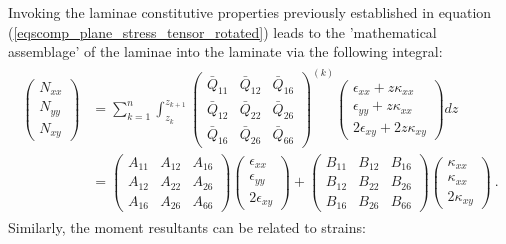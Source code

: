 Invoking the laminae constitutive properties previously established in equation (\ref{eqscomp_plane_stress_tensor_rotated}) leads to the 'mathematical assemblage' of the laminae into the laminate via the following integral:
\begin{gather} 
	\begin{aligned}
		\begin{pmatrix}
			N_{xx} \\
			N_{yy} \\
			N_{xy} 
		\end{pmatrix} 
		& = 
		\sum_{k=1}^n
		\int_{z_k}^{z_{k+1}}
		{\begin{pmatrix}
			\bar{Q}_{11} & \bar{Q}_{12} &  \bar{Q}_{16} \\
			\bar{Q}_{12} & \bar{Q}_{22} &  \bar{Q}_{26} \\
			\bar{Q}_{16} & \bar{Q}_{26} & \bar{Q}_{66} 
		\end{pmatrix}}^{(k)}
		\begin{pmatrix}
			\epsilon_{xx} + z \kappa_{xx}\\
			\epsilon_{yy} + z \kappa_{xx}\\
			2\epsilon_{xy} + 2z\kappa_{xy}
		\end{pmatrix}
		dz \\
		& =
		\begin{pmatrix}
			{A}_{11} & {A}_{12} &  {A}_{16} \\
			{A}_{12} & {A}_{22} &  {A}_{26} \\
			{A}_{16} & {A}_{26} & {A}_{66} 
		\end{pmatrix}
		\begin{pmatrix}
		\epsilon_{xx}\\
		\epsilon_{yy}\\
		2\epsilon_{xy}
		\end{pmatrix}
		+
		\begin{pmatrix}
		{B}_{11} & {B}_{12} &  {B}_{16} \\
		{B}_{12} & {B}_{22} &  {B}_{26} \\
		{B}_{16} & {B}_{26} & {B}_{66} 
		\end{pmatrix}
		\begin{pmatrix}
		 \kappa_{xx}\\
		\kappa_{xx}\\
		2\kappa_{xy}
		\end{pmatrix}\ .
		\label{eqscomp_laminate_constitutive3}
	\end{aligned}
\end{gather}
Similarly, the moment resultants can be related to strains:
